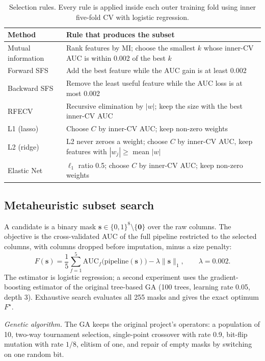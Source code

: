 \documentclass[conference]{IEEEtran}
\begin{document}
\begin{table}[!tb]
\centering
\caption{Selection rules. Every rule is applied inside each outer training fold using inner five-fold CV with logistic regression.}
\label{tab:rules}
\footnotesize
\begin{tabularx}{\columnwidth}{@{}lX@{}}
\toprule
Method & Rule that produces the subset \\
\midrule
Mutual information \cite{kraskov2004} & Rank features by MI; choose the smallest $k$ whose inner-CV AUC is within 0.002 of the best $k$ \\
Forward SFS & Add the best feature while the AUC gain is at least 0.002 \\
Backward SFS & Remove the least useful feature while the AUC loss is at most 0.002 \\
RFECV \cite{guyon2002} & Recursive elimination by $|w|$; keep the size with the best inner-CV AUC \\
L1 (lasso) \cite{tibshirani1996} & Choose $C$ by inner-CV AUC; keep non-zero weights \\
L2 (ridge) & L2 never zeroes a weight; choose $C$ by inner-CV AUC, keep features with $|w_j|\ge$ mean $|w|$ \\
Elastic Net \cite{zou2005} & $\ell_1$ ratio 0.5; choose $C$ by inner-CV AUC; keep non-zero weights \\
\bottomrule
\end{tabularx}
\end{table}

\subsection{Metaheuristic subset search}
A candidate is a binary mask $\mathbf{s}\in\{0,1\}^8\setminus\{\mathbf{0}\}$ over the raw columns. The objective is the cross-validated AUC of the full pipeline restricted to the selected columns, with columns dropped before imputation, minus a size penalty:
\begin{equation}
F(\mathbf{s})=\frac{1}{5}\sum_{f=1}^{5}\mathrm{AUC}_f\bigl(\text{pipeline}(\mathbf{s})\bigr)-\lambda\lVert\mathbf{s}\rVert_1,\qquad\lambda=0.002.
\label{eq:objective}
\end{equation}
The estimator is logistic regression; a second experiment uses the gradient-boosting estimator of the original tree-based GA (100 trees, learning rate 0.05, depth 3). Exhaustive search evaluates all 255 masks and gives the exact optimum $F^\star$.

\textit{Genetic algorithm.} The GA keeps the original project's operators: a population of 10, two-way tournament selection, single-point crossover with rate 0.9, bit-flip mutation with rate $1/8$, elitism of one, and repair of empty masks by switching on one random bit.
\end{document}
